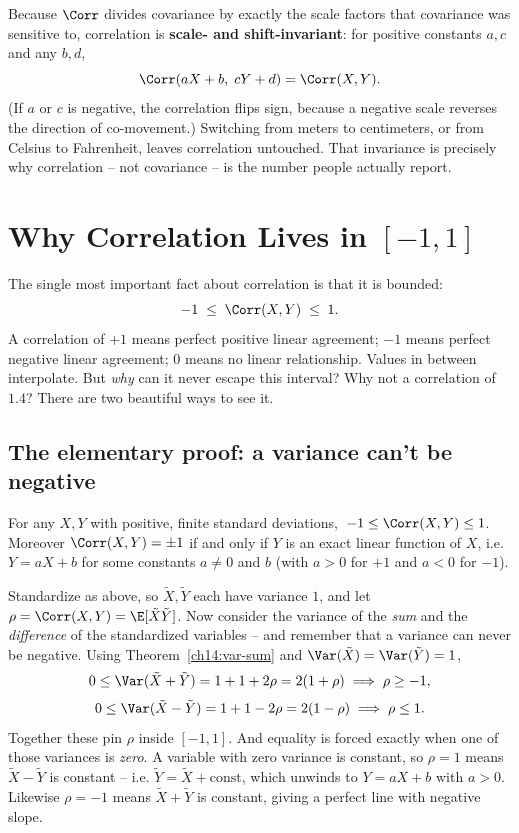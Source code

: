 Because $\Corr$ divides covariance by exactly the scale factors that covariance was
sensitive to, correlation is \textbf{scale- and shift-invariant}: for positive
constants $a, c$ and any $b, d$,
\[
\Corr(aX + b,\; cY + d) = \Corr(X, Y).
\]
(If $a$ or $c$ is negative, the correlation flips sign, because a negative scale
reverses the direction of co-movement.) Switching from meters to centimeters, or
from Celsius to Fahrenheit, leaves correlation untouched. That invariance is
precisely why correlation -- not covariance -- is the number people actually report.

\section{Why Correlation Lives in $[-1, 1]$}
\label{ch14:bounds}

The single most important fact about correlation is that it is bounded:
\[
-1 \;\le\; \Corr(X, Y) \;\le\; 1.
\]
A correlation of $+1$ means perfect positive linear agreement; $-1$ means perfect
negative linear agreement; $0$ means no linear relationship. Values in between
interpolate. But \emph{why} can it never escape this interval? Why not a correlation
of $1.4$? There are two beautiful ways to see it.

\subsection{The elementary proof: a variance can't be negative}

\begin{theorem}
\label{ch14:corr-bound}
For any $X, Y$ with positive, finite standard deviations,
$\,-1 \le \Corr(X, Y) \le 1$. Moreover $\Corr(X, Y) = \pm 1$ if and only if $Y$ is
an exact linear function of $X$, i.e. $Y = aX + b$ for some constants $a \ne 0$ and
$b$ (with $a > 0$ for $+1$ and $a < 0$ for $-1$).
\end{theorem}

\begin{whybox}
Standardize as above, so $\tilde X, \tilde Y$ each have variance $1$, and let
$\rho = \Corr(X,Y) = \E[\tilde X \tilde Y]$. Now consider the variance of the
\emph{sum} and the \emph{difference} of the standardized variables -- and remember
that a variance can never be negative. Using
Theorem~\ref{ch14:var-sum} and $\Var(\tilde X) = \Var(\tilde Y) = 1$,
\[
0 \le \Var(\tilde X + \tilde Y) = 1 + 1 + 2\rho = 2(1 + \rho)
\;\Longrightarrow\; \rho \ge -1,
\]
\[
0 \le \Var(\tilde X - \tilde Y) = 1 + 1 - 2\rho = 2(1 - \rho)
\;\Longrightarrow\; \rho \le 1.
\]
Together these pin $\rho$ inside $[-1, 1]$. And equality is forced exactly when one
of those variances is \emph{zero}. A variable with zero variance is constant, so
$\rho = 1$ means $\tilde X - \tilde Y$ is constant -- i.e. $\tilde Y = \tilde X +
\text{const}$, which unwinds to $Y = aX + b$ with $a > 0$. Likewise $\rho = -1$
means $\tilde X + \tilde Y$ is constant, giving a perfect line with negative slope.
\end{whybox}

